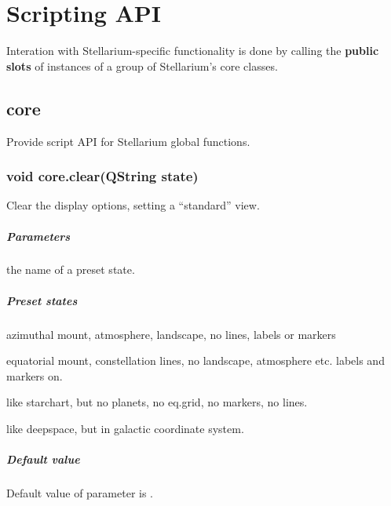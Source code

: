\chapter{Scripting API}
\label{ch:ScriptingAPI}

Interation with Stellarium-specific functionality is done by calling the \textbf{public slots} of instances of a group of Stellarium's core classes.

\section{core}
\label{sec:ScriptingAPI:core}
Provide script API for Stellarium global functions.

\subsection{void core.clear(QString state)}
\label{sec:ScriptingAPI:core:clear}
Clear the display options, setting a ``standard'' view.

\paragraph{Parameters}
\begin{description}[align=right,labelwidth=3cm,leftmargin=3.2cm]
\item[\parameter{state}] the name of a preset state.
\end{description}

\paragraph{Preset states}
\begin{description}[align=right,labelwidth=3cm,leftmargin=3.2cm]
\item[\keymap{natural}] azimuthal mount, atmosphere, landscape, no lines, labels or markers
\item[\keymap{starchart}] equatorial mount, constellation lines, no landscape, atmosphere etc. labels and markers on.
\item[\keymap{deepspace}] like starchart, but no planets, no eq.grid, no markers, no lines.
\item[\keymap{galactic}] like deepspace, but in galactic coordinate system.
\end{description}

\paragraph{Default value}
Default value of parameter is .

